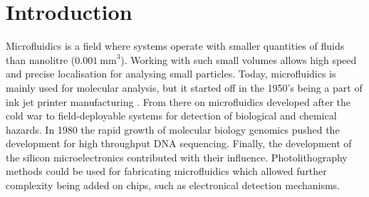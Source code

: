 \documentclass[final]{jyflluk}
\begin{document}






\tableofcontents

\newcommand{\vaali}
    {
    \vskip  0.05in
    }




\section{Introduction}
\label{sec:introduction}

Microfluidics is a field where systems operate with smaller quantities of fluids than nanolitre ($\SI{0.001}{\milli \metre}^3$). Working with such small volumes allows high speed and precise localisation for analysing small particles. Today, microfluidics is mainly used for molecular analysis, but it started off in the 1950’s being a part of ink jet printer manufacturing \cite{gervais_microfluidic_2011}. From there on microfluidics developed after the cold war to field-deployable systems for detection of biological and chemical hazards. In 1980 the rapid growth of molecular biology genomics pushed the development for high throughput DNA sequencing. Finally, the development of the silicon microelectronics contributed with their influence. Photolithography methods could be used for fabricating microfluidics which allowed further complexity being added on chips, such as electronical detection mechanisms. \cite{whitesides_origins_2006}
\end{document}
